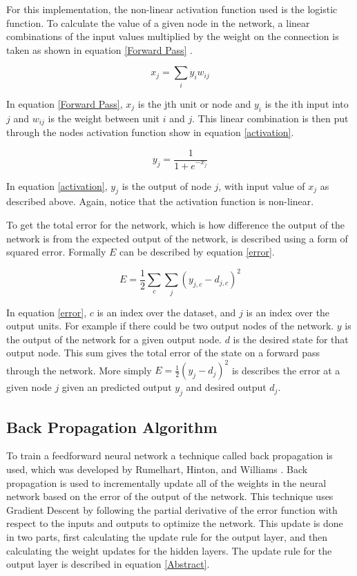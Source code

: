 \documentclass[jair, twoside,11pt,theapa]{article}
\begin{document}
For this implementation, the non-linear activation function used is the logistic function.
To calculate the value of a given node in the network, a linear combinations of the input values multiplied by the weight on the connection is taken as shown in equation \ref{Forward Pass} \cite{BackProp}.

\begin{equation}
\label{Forward Pass}
x_j = \sum_{i}{y_i w_{ij}}
\end{equation}

In equation \ref{Forward Pass}, $x_j$ is the jth unit or node and $y_i$ is the ith input into $j$ and $w_{ij}$ is the weight between unit $i$ and $j$. 
This linear combination is then put through the nodes activation function \cite{BackProp} show in equation \ref{activation}.

\begin{equation}
\label{activation}
y_j = \frac{1}{1+e^{-x_j}}
\end{equation}


In equation \ref{activation}, $y_j$ is the output of node $j$, with input value of $x_j$ as described above. Again, notice that the activation function is non-linear.

To get the total error for the network, which is how difference the output of the network is from the expected output of the network, is described using a form of squared error. Formally $E$ can be described by equation \ref{error}\cite{BackProp}.

\begin{equation}
\label{error}
E = \frac{1}{2} \sum_{c}\sum_{j}(y_{j,c}-d_{j,c})^2
\end{equation}


In equation \ref{error}, $c$ is an index over the dataset, and $j$ is an index over the output units. 
For example if there could be two output nodes of the network. 
$y$ is the output of the network for a given output node.
$d$ is the desired state for that output node. 
This sum gives the total error of the state on a forward pass through the network.
More simply $ E = \frac{1}{2}(y_{j}-d_{j})^2$ is describes the error at a given node $j$ given an predicted output $y_j$ and desired output $d_j$. 

\subsection{Back Propagation Algorithm}
\label{Back Propagation}
To train a feedforward neural network a technique called back propagation is used, which was developed by Rumelhart, Hinton, and Williams . 
Back propagation is used to incrementally update all of the weights in the neural network based on the error of the output of the network. 
This technique uses Gradient Descent by following the partial derivative of the error function with respect to the inputs and outputs to optimize the network. 
This update is done in two parts, first calculating the update rule for the output layer, and then calculating the weight updates for the hidden layers.  
The update rule for the output layer is described in equation \ref{Abstract}.
\end{document}
